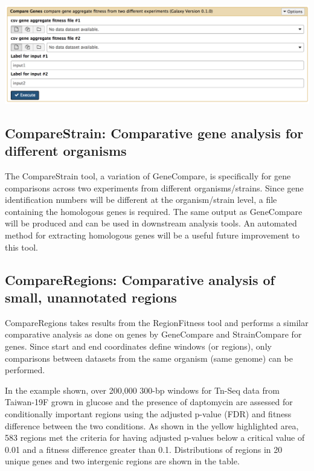 \documentclass[11pt,]{article}
\begin{document}
\centerline{\includegraphics[width=0.8\linewidth]{figs/compareGenes_galaxy.png}}

\subsection{CompareStrain: Comparative gene analysis for different
organisms}\label{comparestrain-comparative-gene-analysis-for-different-organisms}

The CompareStrain tool, a variation of GeneCompare, is specifically for
gene comparisons across two experiments from different
organisms/strains. Since gene identification numbers will be different
at the organism/strain level, a file containing the homologous genes is
required. The same output as GeneCompare will be produced and can be
used in downstream analysis tools. An automated method for extracting
homologous genes will be a useful future improvement to this tool.

\subsection{CompareRegions: Comparative analysis of small, unannotated
regions}\label{compareregions-comparative-analysis-of-small-unannotated-regions}

CompareRegions takes results from the RegionFitness tool and performs a
similar comparative analysis as done on genes by GeneCompare and
StrainCompare for genes. Since start and end coordinates define windows
(or regions), only comparisons between datasets from the same organism
(same genome) can be performed.

In the example shown, over 200,000 300-bp windows for Tn-Seq data from
Taiwan-19F grown in glucose and the presence of daptomycin are assessed
for conditionally important regions using the adjusted p-value (FDR) and
fitness difference between the two conditions. As shown in the yellow
highlighted area, 583 regions met the criteria for having adjusted
p-values below a critical value of 0.01 and a fitness difference greater
than 0.1. Distributions of regions in 20 unique genes and two intergenic
regions are shown in the table.
\end{document}

